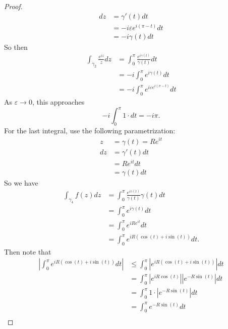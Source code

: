 \documentclass[12pt]{article}
\begin{document}
\begin{proof}
\begin{align*}
    dz &= \gamma '(t)dt \\ 
       &= -i \varepsilon e^{i(\pi - t)} dt \\
       &= -i \gamma (t) dt
  \end{align*}
  So then
  \begin{align*}
  \int_{\gamma_2} \frac{e^{iz}}{z}dz &= \int^{\pi}_0 \frac{e^{i \gamma (t)}}{\gamma (t)}dt \\
                                     &= -i \int^{\pi}_0 e^{i \gamma (t)}dt \\
                                     &= -i \int^{\pi}_0 e^{i \varepsilon e^{i (\pi - t)}}dt
  \end{align*}
  As $\varepsilon \to 0$, this approaches 
  \begin{equation*}
    -i \int^{\pi}_0 1 \cdot dt = -i \pi.
  \end{equation*}
  For the last integral, use the following parametrization:
  \begin{align*}
    z &= \gamma(t)=Re^{it} \\
    dz &= \gamma ' (t)dt \\
       &= Re^{it}dt \\
       &= \gamma (t) dt
  \end{align*}
  So we have 
  \begin{align*}
    \int_{\gamma_4} f(z)dz &= \int^{\pi}_0 \frac{e^{i \gamma (t)}}{\gamma (t)} \gamma (t) dt \\
                           &= \int^{\pi}_0 e^{i \gamma (t)} dt \\
                           &= \int^{\pi}_0 e^{iRe^{it}} dt \\
                           &= \int^{\pi}_0 e^{iR(\cos (t) + i \sin (t))}dt. 
  \end{align*}
  Then note that 
  \begin{align*}
    \left\lvert \int^{\pi}_0 e^{iR(\cos (t) + i \sin (t))}dt \right\rvert & \leq \int^{\pi}_0 \left\lvert e^{iR(\cos (t) + i \sin (t))} \right \rvert dt \\
                                                                        &= \int^{\pi}_0 \left \lvert e^{iR\cos(t)} \right\rvert \left\lvert e^{-R\sin(t)}\right\rvert dt \\
                                                                        &= \int^{\pi}_0 1 \cdot \left\lvert e^{-R\sin(t)} \right\rvert dt \\
                                                                        &= \int^{\pi}_0 e^{-R\sin(t)}dt \\

\end{align*}
\end{proof}
\end{document}
